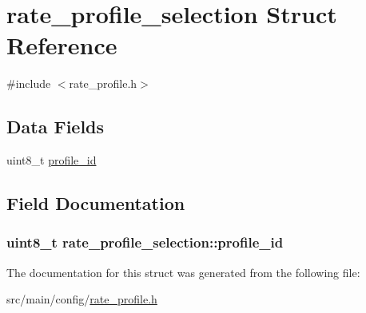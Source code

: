 \hypertarget{structrate__profile__selection}{\section{rate\+\_\+profile\+\_\+selection Struct Reference}
\label{structrate__profile__selection}
}


{\ttfamily \#include $<$rate\+\_\+profile.\+h$>$}

\subsection*{Data Fields}
\begin{DoxyCompactItemize}
\item 
uint8\+\_\+t \hyperlink{structrate__profile__selection_a214a734b65bf64dbce2fe96b3ebe1465}{profile\+\_\+id}
\end{DoxyCompactItemize}


\subsection{Field Documentation}
\hypertarget{structrate__profile__selection_a214a734b65bf64dbce2fe96b3ebe1465}{
\subsubsection[{profile\+\_\+id}]{\setlength{\rightskip}{0pt plus 5cm}uint8\+\_\+t rate\+\_\+profile\+\_\+selection\+::profile\+\_\+id}}\label{structrate__profile__selection_a214a734b65bf64dbce2fe96b3ebe1465}


The documentation for this struct was generated from the following file\+:\begin{DoxyCompactItemize}
\item 
src/main/config/\hyperlink{config_2rate__profile_8h}{rate\+\_\+profile.\+h}\end{DoxyCompactItemize}
